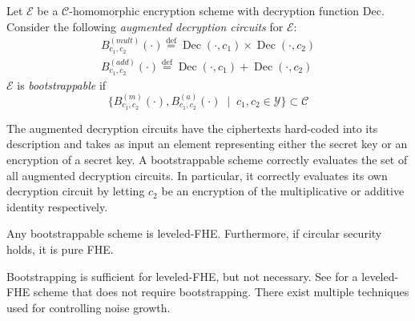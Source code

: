 



\begin{definition}
    Let $\mathcal{E}$ be a $\mathcal{C}$-homomorphic encryption scheme with decryption function Dec. Consider the following \textit{augmented decryption circuits} for $\mathcal{E}$:
    \begin{equation*}
    \begin{aligned}        
        B_{c_1,c_2}^{(mult)}(\cdot) \stackrel{\mathrm{def}}{=} \operatorname{Dec}(\cdot, c_1) \times \operatorname{Dec}(\cdot, c_2)\\
        B_{c_1,c_2}^{(add)}(\cdot) \stackrel{\mathrm{def}}{=} \operatorname{Dec}(\cdot, c_1) + \operatorname{Dec}(\cdot, c_2)
    \end{aligned}
    \end{equation*}
    $\mathcal{E}$ is \textit{bootstrappable} if
    \begin{equation*}
    \{B_{c_1,c_2}^{(m)}(\cdot), B_{c_1,c_2}^{(a)}(\cdot) \; \mid \; c_1, c_2 \in \mathcal{Y}\} \subset \mathcal{C}
    \end{equation*}
\end{definition}
The augmented decryption circuits have the ciphertexts hard-coded into its description and takes as input an element representing either the secret key or an encryption of a secret key. A bootstrappable scheme correctly evaluates the set of all augmented decryption circuits. In particular, it correctly evaluates its own decryption circuit by letting $c_2$ be an encryption of the multiplicative or additive identity respectively.

\begin{theorem}
Any bootstrappable scheme is leveled-FHE. Furthermore, if circular security holds, it is pure FHE.
\end{theorem}
\begin{remark}
    Bootstrapping is sufficient for leveled-FHE, but not necessary. See \cite{BGV12-no-bootstrap} for a leveled-FHE scheme that does not require bootstrapping. There exist multiple techniques used for controlling noise growth.
\end{remark}

